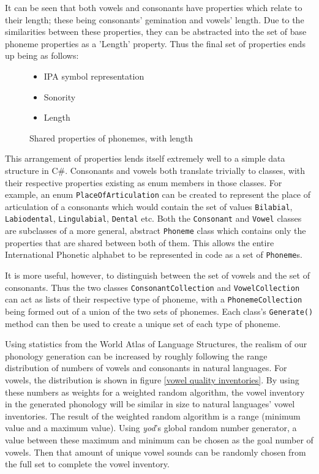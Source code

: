 \documentclass{report}
\newcommand{\Csh}{C{\lserif\#}}
\begin{document}
	It can be seen that both vowels and consonants have properties which relate to their length; these being consonants' gemination and vowels' length. Due to the similarities between these properties, they can be abstracted into the set of base phoneme properties as a 'Length' property. Thus the final set of properties ends up being as follows:

	\begin{figure}[h]
	\caption{Shared properties of phonemes, with length}
	\label{shared properties of phonemes with length}
	\begin{tcolorbox}
		\begin{itemize}
			\item IPA symbol representation
			\item Sonority
			\item Length
		\end{itemize}
	\end{tcolorbox}
	\end{figure}

	This arrangement of properties lends itself extremely well to a simple data structure in \Csh{}. Consonants and vowels both translate trivially to classes, with their respective properties existing as enum members in those classes. For example, an enum \texttt{PlaceOfArticulation} can be created to represent the place of articulation of a consonants which would contain the set of values \texttt{Bilabial}, \texttt{Labiodental}, \texttt{Lingulabial}, \texttt{Dental} etc. Both the \texttt{Consonant} and \texttt{Vowel} classes are subclasses of a more general, abstract \texttt{Phoneme} class which contains only the properties that are shared between both of them. This allows the entire International Phonetic alphabet to be represented in code as a set of \texttt{Phoneme}s.
	
	It is more useful, however, to distinguish between the set of vowels and the set of consonants. Thus the two classes \texttt{ConsonantCollection} and \texttt{VowelCollection} can act as lists of their respective type of phoneme, with a \texttt{PhonemeCollection} being formed out of a union of the two sets of phonemes. Each class's \texttt{Generate()} method can then be used to create a unique set of each type of phoneme.
	
	Using statistics from the World Atlas of Language Structures, the realism of our phonology generation can be increased by roughly following the range distribution of numbers of vowels and consonants in natural languages. For vowels, the distribution is shown in figure \ref{vowel quality inventories}. By using these numbers as weights for a weighted random algorithm, the vowel inventory in the generated phonology will be similar in size to natural languages' vowel inventories. The result of the weighted random algorithm is a range (minimum value and a maximum value). Using \textit{yod}'s global random number generator, a value between these maximum and minimum can be chosen as the goal number of vowels. Then that amount of unique vowel sounds can be randomly chosen from the full set to complete the vowel inventory.
	
\end{document}

